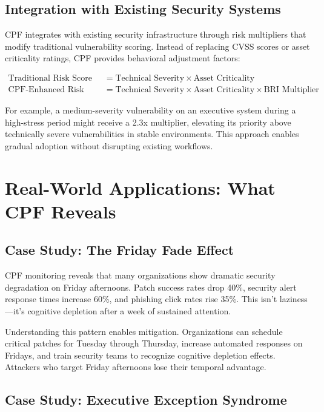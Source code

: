 \documentclass[11pt,a4paper]{article}
\begin{document}
\subsection{Integration with Existing Security Systems}

CPF integrates with existing security infrastructure through risk multipliers that modify traditional vulnerability scoring. Instead of replacing CVSS scores or asset criticality ratings, CPF provides behavioral adjustment factors:

\begin{align}
\text{Traditional Risk Score} &= \text{Technical Severity} \times \text{Asset Criticality} \\
\text{CPF-Enhanced Risk Score} &= \text{Technical Severity} \times \text{Asset Criticality} \times \text{BRI Multiplier}
\end{align}

For example, a medium-severity vulnerability on an executive system during a high-stress period might receive a 2.3x multiplier, elevating its priority above technically severe vulnerabilities in stable environments. This approach enables gradual adoption without disrupting existing workflows.

\section{Real-World Applications: What CPF Reveals}

\subsection{Case Study: The Friday Fade Effect}

CPF monitoring reveals that many organizations show dramatic security degradation on Friday afternoons. Patch success rates drop 40\%, security alert response times increase 60\%, and phishing click rates rise 35\%. This isn't laziness—it's cognitive depletion after a week of sustained attention.

Understanding this pattern enables mitigation. Organizations can schedule critical patches for Tuesday through Thursday, increase automated responses on Fridays, and train security teams to recognize cognitive depletion effects. Attackers who target Friday afternoons lose their temporal advantage.

\subsection{Case Study: Executive Exception Syndrome}
\end{document}

